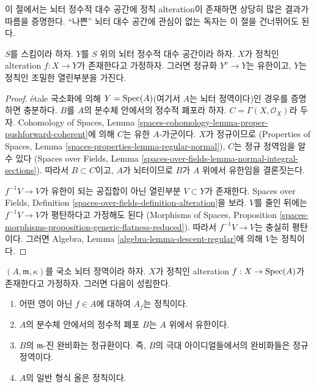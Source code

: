 \noindent
이 절에서는 뇌터 정수적 대수 공간에 정칙 alteration이 존재하면
상당히 많은 결과가 따름을 증명한다.
“나쁜” 뇌터 대수 공간에 관심이 없는 독자는 이 절을 건너뛰어도 된다.

\begin{lemma}
\label{lemma-regular-alteration-implies}
$S$를 스킴이라 하자. $Y$를 $S$ 위의 뇌터 정수적 대수 공간이라 하자.
$X$가 정칙인 alteration $f : X \to Y$가 존재한다고 가정하자.
그러면 정규화 $Y^\nu \to Y$는 유한이고,
$Y$는 정칙인 조밀한 열린부분을 가진다.
\end{lemma}

\begin{proof}
\'etale 국소화에 의해 $Y = \mathop{\mathrm{Spec}}(A)$(여기서 $A$는 뇌터 정역이다)인
경우를 증명하면 충분하다.
$B$를 $A$의 분수체 안에서의 정수적 폐포라 하자.
$C = \Gamma(X, \mathcal{O}_X)$라 두자. Cohomology of Spaces, Lemma
\ref{spaces-cohomology-lemma-proper-pushforward-coherent}에 의해
$C$는 유한 $A$-가군이다.
$X$가 정규이므로
(Properties of Spaces, Lemma
\ref{spaces-properties-lemma-regular-normal}),
$C$는 정규 정역임을 알 수 있다
(Spaces over Fields, Lemma
\ref{spaces-over-fields-lemma-normal-integral-sections}).
따라서 $B \subset C$이고, $A$가 뇌터이므로
$B$가 $A$ 위에서 유한임을 결론짓는다.

\medskip\noindent
$f^{-1}V \to V$가 유한이 되는 공집합이 아닌 열린부분
$V \subset Y$가 존재한다. Spaces over Fields, Definition
\ref{spaces-over-fields-definition-alteration}을 보라.
$V$를 줄인 뒤에는 $f^{-1}V \to V$가 평탄하다고 가정해도 된다
(Morphisms of Spaces, Proposition
\ref{spaces-morphisms-proposition-generic-flatness-reduced}).
따라서 $f^{-1}V \to V$는 충실히 평탄이다. 그러면 Algebra, Lemma
\ref{algebra-lemma-descent-regular}에 의해 $V$는 정칙이다.
\end{proof}

\begin{lemma}
\label{lemma-regular-alteration-implies-local}
$(A, \mathfrak m, \kappa)$를 국소 뇌터 정역이라 하자.
$X$가 정칙인 alteration $f : X \to \mathop{\mathrm{Spec}}(A)$가 존재한다고 가정하자.
그러면 다음이 성립한다.
\begin{enumerate}
\item 어떤 영이 아닌 $f \in A$에 대하여 $A_f$는 정칙이다.
\item $A$의 분수체 안에서의 정수적 폐포 $B$는 $A$ 위에서 유한이다.
\item $B$의 $\mathfrak m$-진 완비화는 정규환이다. 즉,
$B$의 극대 아이디얼들에서의 완비화들은 정규 정역이다.
\item $A$의 일반 형식 올은 정칙이다.
\end{enumerate}
\end{lemma}

